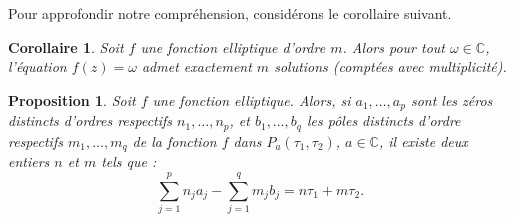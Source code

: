 \documentclass[12pt]{article}
\newtheorem{corollary}{Corollaire}
\newtheorem{proposition}{Proposition}
\begin{document}
        Pour approfondir notre compréhension, considérons le corollaire suivant.

        \begin{corollary}
        Soit \( f \) une fonction elliptique d'ordre \( m \). Alors pour tout \( \omega \in \mathbb{C} \), l'équation \( f(z) = \omega \) admet exactement \( m \) solutions (comptées avec multiplicité).
        \end{corollary}

        \begin{proposition}
        Soit \( f \) une fonction elliptique. Alors, si \( a_1, \ldots, a_p \) sont les zéros distincts d'ordres respectifs \( n_1, \ldots, n_p \), et \( b_1, \ldots, b_q \) les pôles distincts d'ordre respectifs \( m_1, \ldots, m_q \) de la fonction \( f \) dans \( P_{a}(\tau_1, \tau_2) \), \( a \in \mathbb{C} \), il existe deux entiers \( n \) et \( m \) tels que :
        \[
        \sum_{j=1}^p n_j a_j - \sum_{j=1}^q m_j b_j = n\tau_1 + m\tau_2.
        \]
        \end{proposition}
\end{document}
